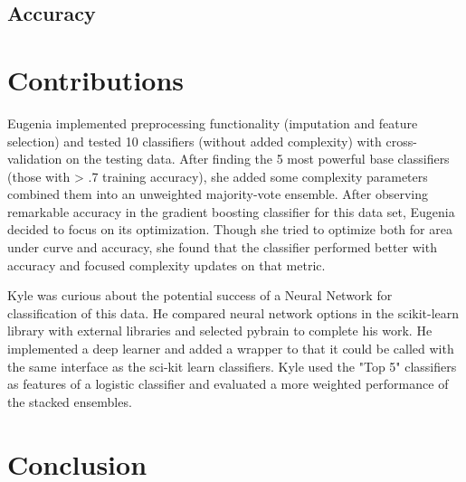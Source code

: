 \documentclass{article}
\begin{document}
\subsection{Accuracy}


\section{Contributions}

Eugenia implemented preprocessing functionality (imputation and feature selection) and tested 10 classifiers (without added complexity) with cross-validation on the testing data. 
After finding the 5 most powerful base classifiers (those with > .7 training accuracy), she added some complexity parameters combined them into an unweighted majority-vote ensemble. 
After observing remarkable accuracy in the gradient boosting classifier for this data set, Eugenia decided to focus on its optimization.
Though she tried to optimize both for area under curve and accuracy, she found that the classifier performed better with accuracy and focused complexity updates on that metric.

Kyle was curious about the potential success of a Neural Network for classification of this data. 
He compared neural network options in the scikit-learn library with external libraries and selected pybrain to complete his work.
He implemented a deep learner and added a wrapper to that it could be called with the same interface as the sci-kit learn classifiers.
Kyle used the "Top 5" classifiers as features of a logistic classifier and evaluated a more weighted performance of the stacked ensembles.


\section{Conclusion}




\end{document}
